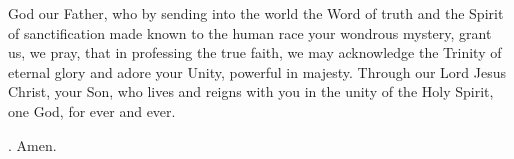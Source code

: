 \lettrine[lines=3]{G}{}od our Father, who by sending into the world
the Word of truth and the Spirit of sanctification
made known to the human race your wondrous mystery,
grant us, we pray, that in professing the true faith,
we may acknowledge the Trinity of eternal glory
and adore your Unity, powerful in majesty.
Through our Lord Jesus Christ, your Son,
who lives and reigns with you in the unity of the Holy Spirit,
one God, for ever and ever. \par \Rbar. Amen.
